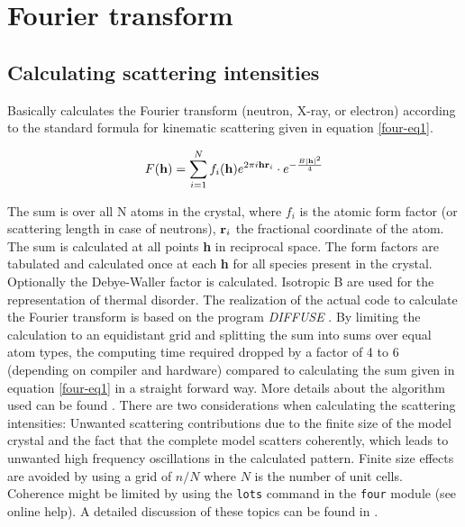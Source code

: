 
\chapter{Fourier transform \label{four}}

\section{Calculating scattering intensities \label{four-int}}

Basically {\Discus} calculates the Fourier transform (neutron, 
X-ray, or electron)
according to the standard formula for kinematic scattering given in
equation \ref{four-eq1}.

\begin{equation}
        F({\bf h}) = \sum_{i=1}^{N} f_{i}({\bf h}) e ^{2 \pi i {\bf hr}_{i}}
                     \cdot e ^{- \frac{B |{\bf h}|^{2}}{4}}
        \label{four-eq1}
\end{equation}

The sum is over all N atoms in the crystal, where $f_{i}$ is the
atomic form factor (or scattering length in case of neutrons), ${\bf
r}_{i}$ the fractional coordinate of the atom.  The sum is
calculated at all points {\bf h} in reciprocal space.  The form
factors are tabulated and calculated once at each {\bf h} for all
species present in the crystal.  Optionally the Debye-Waller factor
is calculated.  Isotropic B are used for the representation of
thermal disorder. The realization of the actual code to calculate
the Fourier transform is based on the program {\it DIFFUSE}
\citep{buwe92}.  By limiting the calculation to an equidistant grid
and splitting the sum into sums over equal atom types, the computing
time required dropped by a factor of 4 to 6 (depending on compiler
and hardware) compared to calculating the sum given in equation
\ref{four-eq1} in a straight forward way.  More details about the
algorithm used can be found \citet{buwe92}. There are two
considerations when calculating the scattering intensities: Unwanted
scattering contributions due to the finite size of the model crystal
and the fact that the complete model scatters coherently, which
leads to unwanted high frequency oscillations in the calculated
pattern. Finite size effects are avoided by using a grid of $n/N$
where $N$ is the number of unit cells. Coherence might be limited by
using the {\tt lots} command in the {\tt four} module (see online
help). A detailed discussion of these topics can be found in
\cite{nedpro}.
\par

